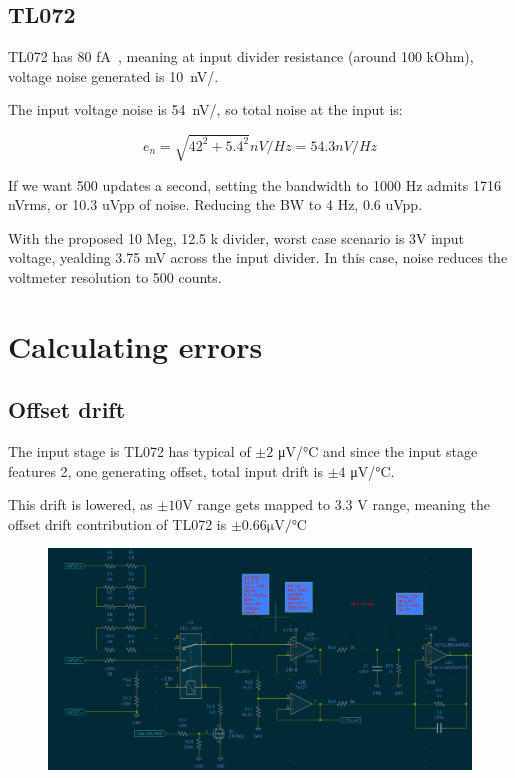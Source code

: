 \documentclass[11pt]{article}
\begin{document}
\subsection{TL072}
TL072 has 80 \si{\femto \ampere \sqrt{\hertz}}, meaning at input divider
resistance (around 100 kOhm), voltage noise generated is \si{10 nV/}.

The input voltage noise is \si{54 nV/}, so total noise at the input
is: 

\begin{equation}
  e_n = \sqrt{ 42^2 + 5.4^2} nV/Hz = 54.3 nV/Hz
  \label{eq:NCS218xx input noise}
\end{equation}

If we want 500 updates a second, setting the bandwidth to 1000 Hz admits 
1716 nVrms, or 10.3 uVpp of noise.
Reducing the BW to 4 Hz, 0.6 uVpp.

With the proposed 10 Meg, 12.5 k divider, worst case scenario is 3V input voltage,
yealding 3.75 mV across the input divider. In this case, noise reduces the 
voltmeter resolution to 500 counts.

\pagebreak
\section{Calculating errors}

\subsection{Offset drift}

The input stage is TL072 has typical of $\pm 2$ \si{\micro \volt / \celsius} and 
since the input stage features 2, one generating offset, total input 
drift is $\pm 4$ \si{\micro \volt / \celsius}. 

This drift is lowered, as $\pm 10 \si{\volt}$ range gets mapped to 3.3 \si{\volt}
range, meaning the offset drift contribution of TL072 is 
$\pm0.66  \si{\micro \volt / \celsius}$

\begin{figure}[H]
  \centering 
  \includegraphics[scale=0.55]{"./figs/Input_amp.png"}
\end{figure}
\end{document}
